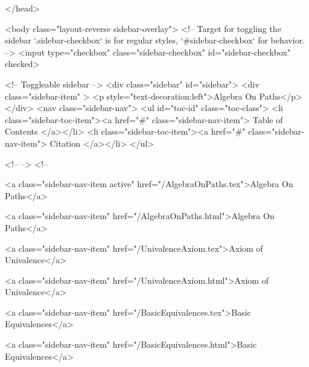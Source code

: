   
</head>




  <body class="layout-reverse sidebar-overlay">
    <!-- Target for toggling the sidebar `.sidebar-checkbox` is for regular
     styles, `#sidebar-checkbox` for behavior. -->
<input type="checkbox" class="sidebar-checkbox" id="sidebar-checkbox" checked>

<!-- Toggleable sidebar -->
<div class="sidebar" id="sidebar">
  <div class="sidebar-item" >
    <p style="text-decoration:left">Algebra On Paths</p>
  </div>
  <nav class="sidebar-nav">
    <ul id="toc-id" class="toc-class">
  <li class="sidebar-toc-item"><a href="#" class="sidebar-nav-item"> Table of Contents </a></li>
  <li class="sidebar-toc-item"><a href="#" class="sidebar-nav-item"> Citation </a></li>
</ul>


    <!--  -->
    <!-- 
      
    
      
    
      
    
      
    
      
        
      
    
      
        
          <a class="sidebar-nav-item active" href="/AlgebraOnPaths.tex">Algebra On Paths</a>
        
      
    
      
        
          <a class="sidebar-nav-item" href="/AlgebraOnPaths.html">Algebra On Paths</a>
        
      
    
      
        
          <a class="sidebar-nav-item" href="/UnivalenceAxiom.tex">Axiom of Univalence</a>
        
      
    
      
        
          <a class="sidebar-nav-item" href="/UnivalenceAxiom.html">Axiom of Univalence</a>
        
      
    
      
        
          <a class="sidebar-nav-item" href="/BasicEquivalences.tex">Basic Equivalences</a>
        
      
    
      
        
          <a class="sidebar-nav-item" href="/BasicEquivalences.html">Basic Equivalences</a>
        
